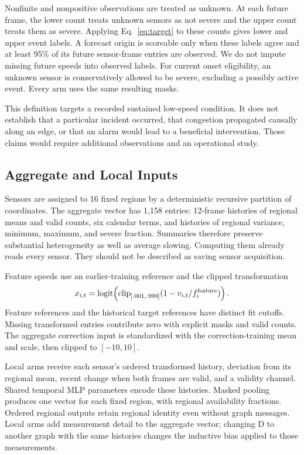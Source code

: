 \documentclass{llncs}
\begin{document}
Nonfinite and nonpositive observations are treated as unknown. At each future frame, the lower count treats unknown sensors as not severe and the upper count treats them as severe. Applying Eq.~\ref{eq:target} to these counts gives lower and upper event labels. A forecast origin is scoreable only when these labels agree and at least 95\% of its future sensor-frame entries are observed. We do not impute missing future speeds into observed labels. For current onset eligibility, an unknown sensor is conservatively allowed to be severe, excluding a possibly active event. Every arm uses the same resulting masks.

This definition targets a recorded sustained low-speed condition. It does not establish that a particular incident occurred, that congestion propagated causally along an edge, or that an alarm would lead to a beneficial intervention. Those claims would require additional observations and an operational study.

\subsection{Aggregate and Local Inputs}
Sensors are assigned to 16 fixed regions by a deterministic recursive partition of coordinates. The aggregate vector has 1,158 entries: 12-frame histories of regional means and valid counts, six calendar terms, and histories of regional variance, minimum, maximum, and severe fraction. Summaries therefore preserve substantial heterogeneity as well as average slowing. Computing them already reads every sensor. They should not be described as saving sensor acquisition.

Feature speeds use an earlier-training reference and the clipped transformation
\begin{equation}
 x_{i,t}=\operatorname{logit}\!\left(\operatorname{clip}_{[.001,\allowbreak .999]}(1-v_{i,t}/f_i^{\rm feature})\right).
\end{equation}
Feature references and the historical target references have distinct fit cutoffs. Missing transformed entries contribute zero with explicit masks and valid counts. The aggregate correction input is standardized with the correction-training mean and scale, then clipped to $[-10,10]$.

Local arms receive each sensor's ordered transformed history, deviation from its regional mean, recent change when both frames are valid, and a validity channel. Shared temporal MLP parameters encode these histories. Masked pooling produces one vector for each fixed region, with regional availability fractions. Ordered regional outputs retain regional identity even without graph messages. Local arms add measurement detail to the aggregate vector; changing D to another graph with the same histories changes the inductive bias applied to those measurements.
\end{document}
